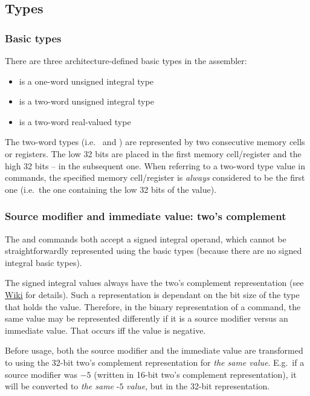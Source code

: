 \subsection{Types}

\subsubsection{Basic types}

\vspace{-0.2cm}
There are three architecture-defined basic types in the  assembler:

\begin{itemize}
    \item {} is a one-word unsigned integral type
    \item {} is a two-word unsigned integral type
    \item {} is a two-word real-valued type
\end{itemize}

\hypertarget{types:two_words_storage}{}
The two-word types (i.e.\  and ) are represented by two consecutive memory cells or registers. The low 32 bits are placed in the first memory cell/register and the high 32 bits -- in the subsequent one. When referring to a two-word type value in commands, the specified memory cell/register is \textit{always} considered to be the first one (i.e.\ the one containing the low 32 bits of the value).

\hypertarget{types:twos_complement}{
    \subsubsection{Source modifier and immediate value: two's complement}
}

The  and  commands both accept a signed integral operand, which cannot be straightforwardly represented using the basic types (because there are no signed integral basic types).

The signed integral values always have the two's complement representation (see \href{https://en.wikipedia.org/wiki/Two\%27s_complement}{Wiki} for details). Such a representation is dependant on the bit size of the type that holds the value. Therefore, in the binary representation of a command, the same value may be represented differently if it is a source modifier versus an immediate value. That occurs iff the value is negative.

Before usage, both the source modifier and the immediate value are transformed to  using the 32-bit two's complement representation for \textit{the same value}. E.g.\ if a source modifier was $-5$ (written in 16-bit two's complement representation), it will be converted to \textit{the same} $\textit{-5}$ \textit{value}, but in the 32-bit representation.

